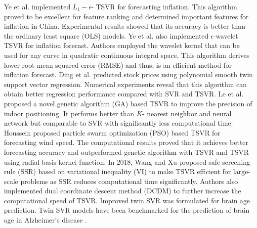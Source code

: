 \documentclass[pdflatex,sn-mathphys]{sn-jnl}%
\theoremstyle{thmstyleone}%
\theoremstyle{thmstyletwo}%
\theoremstyle{thmstylethree}%
\begin{document}
Ye et al. \cite{ye2013exploring} implemented $L_1-\epsilon$- TSVR for forecasting inflation. This algorithm proved to be excellent for feature ranking and determined important features for inflation in China. Experimental results showed that its accuracy is better than the ordinary least square (OLS) models. Ye et al. \cite{ye2013comparing} also implemented $\epsilon$-wavelet TSVR for inflation forecast. Authors employed the wavelet kernel that can be used for any curve in quadratic continuous integral space. This algorithm derives lower root mean squared error (RMSE) and thus, is an efficient method for inflation forecast. Ding et al. \cite{ding2013forecasting} predicted stock prices using polynomial smooth twin support vector regression. Numerical experiments reveal that this algorithm can obtain better regression performance compared with SVR and TSVR. Le et al. \cite{le2014novel} proposed a novel genetic algorithm (GA) based TSVR to improve the precision of indoor positioning. It performs better than $K$- nearest neighbor and neural network but comparable to SVR with significantly less computational time. Houssein \cite{houssein2017particle} proposed particle swarm optimization (PSO) based TSVR for forecasting wind speed. The computational results proved that it achieves better forecasting accuracy and outperformed genetic algorithm with TSVR and TSVR using radial basis kernel function. In 2018, Wang and Xu \cite{wang2018scaling} proposed safe screening rule (SSR) based on variational inequality (VI) to make TSVR efficient for large-scale problems as SSR reduces computational time significantly. Authors also implemented dual coordinate descent method (DCDM) to further increase the computational speed of TSVR. Improved twin SVR \cite{ganaiebrain2021,ganaie2021predictingbrain} was formulated for brain age prediction. Twin SVR models have been benchmarked for the prediction of brain age in Alzheimer's disease \cite{beheshti2021predicting}.
\end{document}
